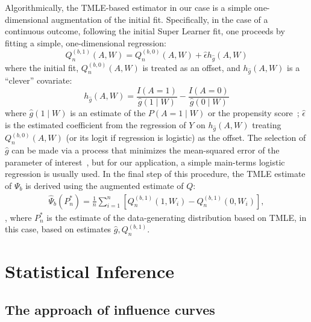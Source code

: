 Algorithmically, the TMLE-based estimator in our case is a simple
one-dimensional augmentation of the initial fit. Specifically, in the case of
a continuous outcome, following the initial Super Learner fit, one proceeds by
fitting a simple, one-dimensional regression:
$$
Q^{(b, 1)}_n(A, W) = Q^{(b, 0)}_n(A, W) + \hat{\epsilon} h_{\hat{g}}(A, W)
$$
where the initial fit, $Q^{(b, 0)}_n(A, W)$ is treated as an offset, and
$h_{\hat{g}}(A, W)$ is a ``clever'' covariate:
$$
h_{\hat{g}}(A, W) = \frac{I(A = 1)}{\hat{g}(1 \mid W)} - \frac{I(A = 0)}{\hat{g}(0 \mid W)}
$$
where $\hat{g}(1 \mid W)$ is an estimate of the $P(A = 1 \mid W)$ or the
propensity score~\cite{rosenbaum1983central}; $\hat{\epsilon}$ is the estimated
coefficient from the regression of $Y$ on $h_{\hat{g}}(A, W)$ treating
$Q^{(b, 0)}_n(A, W)$ (or its logit if regression is logistic) as the offset.
The selection of $\hat{g}$ can be made via a process that minimizes the
mean-squared error of the parameter of interest~\cite{gruber2010application},
but for our application, a simple main-terms logistic regression is usually
used. In the final step of this procedure, the TMLE estimate of $\Psi_b$ is
derived using the augmented estimate of $Q$:
\begin{eqnarray}
\hat{\Psi}_b(P^*_n) = \frac{1}{n}\sum^{n}_{i = 1}[Q^{(b, 1)}_n(1, W_i) - Q^{(b, 1)}_{n}(0, W_i)],
\end{eqnarray}
, where $P^*_n$ is the estimate of the data-generating distribution based on
TMLE, in this case, based on estimates $\hat{g},Q^{(b,1)}_n$.

\section{Statistical Inference}\label{inference}

\subsection{The approach of influence curves}\label{ic}


